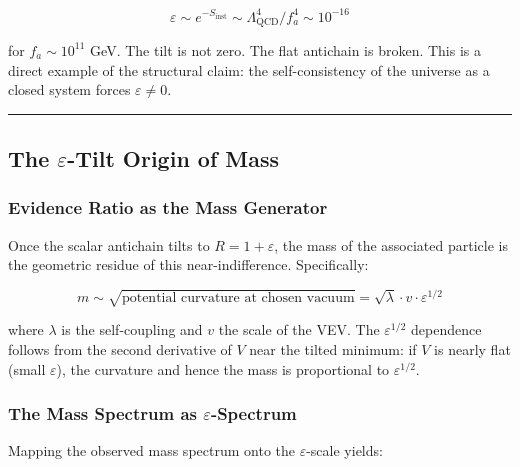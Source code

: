\documentclass[12pt,a4paper]{article}
\begin{document}
\[\varepsilon \sim e^{-S_\text{inst}} \sim \Lambda_\text{QCD}^4 / f_a^4 \sim 10^{-16}\]

for \(f_a \sim 10^{11}\) GeV. The tilt is not zero. The flat antichain
is broken. This is a direct example of the structural claim: the
self-consistency of the universe as a closed system forces
\(\varepsilon \ne 0\).

\begin{center}\rule{0.5\linewidth}{0.5pt}\end{center}

\hypertarget{the-varepsilon-tilt-origin-of-mass}{%
\subsection{\texorpdfstring{The \(\varepsilon\)-Tilt Origin of
Mass}{The \textbackslash varepsilon-Tilt Origin of Mass}}\label{the-varepsilon-tilt-origin-of-mass}}

\hypertarget{evidence-ratio-as-the-mass-generator}{%
\subsubsection{Evidence Ratio as the Mass
Generator}\label{evidence-ratio-as-the-mass-generator}}

Once the scalar antichain tilts to \(R = 1 + \varepsilon\), the mass of
the associated particle is the geometric residue of this
near-indifference. Specifically:

\[m \sim \sqrt{\text{potential curvature at chosen vacuum}} = \sqrt{\lambda} \cdot v \cdot \varepsilon^{1/2}\]

where \(\lambda\) is the self-coupling and \(v\) the scale of the VEV.
The \(\varepsilon^{1/2}\) dependence follows from the second derivative
of \(V\) near the tilted minimum: if \(V\) is nearly flat (small
\(\varepsilon\)), the curvature and hence the mass is proportional to
\(\varepsilon^{1/2}\).

\hypertarget{the-mass-spectrum-as-varepsilon-spectrum}{%
\subsubsection{\texorpdfstring{The Mass Spectrum as
\(\varepsilon\)-Spectrum}{The Mass Spectrum as \textbackslash varepsilon-Spectrum}}\label{the-mass-spectrum-as-varepsilon-spectrum}}

Mapping the observed mass spectrum onto the \(\varepsilon\)-scale
yields:
\end{document}
